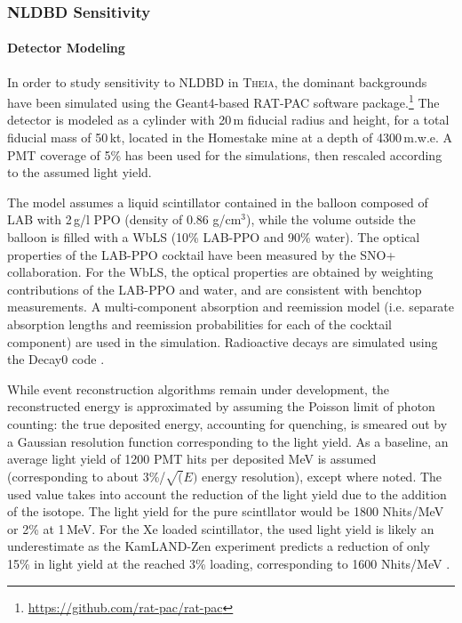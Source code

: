 \subsubsection{NLDBD Sensitivity}
\label{sec::sensitivity}
\paragraph{Detector Modeling}
In order to study sensitivity to NLDBD in \textsc{Theia}, the dominant
backgrounds have been simulated using the Geant4-based RAT-PAC software
package.\footnote{\url{https://github.com/rat-pac/rat-pac}}
The detector is modeled as a cylinder with 20\,m fiducial radius and height, for a
total fiducial mass of 50\,kt, located in the Homestake mine at a depth of 4300\,m.w.e.
A PMT coverage of 5\% has been used for the simulations, then rescaled
according to the assumed light yield.

The model assumes a liquid scintillator contained in the balloon
composed of LAB with 2\,g/l PPO (density of 0.86 g/cm$^3$), while the volume outside the balloon is
filled with a WbLS (10\% LAB-PPO and 90\% water). The optical properties of
the LAB-PPO cocktail have been measured by the SNO+ collaboration. For the
WbLS, the optical properties are obtained by weighting contributions of the
LAB-PPO and water, and are consistent with benchtop measurements.
A multi-component absorption and reemission model (i.e. separate absorption
lengths and reemission probabilities for each of the cocktail component) are
used in the simulation. Radioactive decays are simulated using the Decay0
code \cite{decay0}.

While event reconstruction algorithms remain under development, the
reconstructed energy is approximated by assuming the Poisson limit of
photon counting: the true deposited energy, accounting for quenching, is
smeared out by a Gaussian resolution function corresponding to the light
yield. As a baseline, an average light yield of 1200 PMT hits per deposited
MeV is assumed (corresponding to about 3\%/$\sqrt(E)$ energy resolution), except where noted. The used value takes into account the reduction of the light yield due to the addition of the isotope. The light yield for the pure scintllator would be 1800 Nhits/MeV or 2\% at 1\,MeV. For the Xe loaded scintillator, the used light yield is likely an underestimate as the KamLAND-Zen experiment predicts a reduction of only 15\% in light yield at the reached 3\% loading, corresponding to 1600 Nhits/MeV \cite{KZ-2011}.

